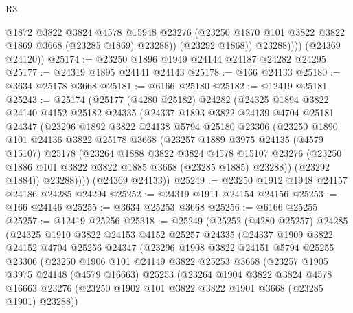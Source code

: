 \begin{lexlean}{R3}
\begin{coremodule}
                  @1872
                  @3822
                  @3824
                  @4578
                  @15948
                  @23276
                  (@23250 @1870 @101 @3822 @3822 @1869 @3668 (@23285 @1869) @23288))
                (@23292 @1868))
              @23288))))
      (@24369 @24120))
@25174 := @23250 @1896 @1949 @24144 @24187 @24282 @24295
@25177 := @24319 @1895 @24141 @24143
@25178 := @166 @24133
@25180 := @3634 @25178 @3668
@25181 := @6166 @25180
@25182 := @12419 @25181
@25243 := @25174
    (@25177
      (@4280 @25182)
      @24282
      (@24325
        @1894
        @3822
        @24140
        @4152
        @25182
        @24335
        (@24337
          @1893
          @3822
          @24139
          @4704
          @25181
          @24347
          (@23296
            @1892
            @3822
            @24138
            @5794
            @25180
            @23306
            (@23250
              @1890
              @101
              @24136
              @3822
              @25178
              @3668
              (@23257
                @1889
                @3975
                @24135
                (@4579 @15107)
                @25178
                (@23264
                  @1888
                  @3822
                  @3824
                  @4578
                  @15107
                  @23276
                  (@23250 @1886 @101 @3822 @3822 @1885 @3668 (@23285 @1885) @23288))
                (@23292 @1884))
              @23288))))
      (@24369 @24133))
@25249 := @23250 @1912 @1948 @24157 @24186 @24285 @24294
@25252 := @24319 @1911 @24154 @24156
@25253 := @166 @24146
@25255 := @3634 @25253 @3668
@25256 := @6166 @25255
@25257 := @12419 @25256
@25318 := @25249
    (@25252
      (@4280 @25257)
      @24285
      (@24325
        @1910
        @3822
        @24153
        @4152
        @25257
        @24335
        (@24337
          @1909
          @3822
          @24152
          @4704
          @25256
          @24347
          (@23296
            @1908
            @3822
            @24151
            @5794
            @25255
            @23306
            (@23250
              @1906
              @101
              @24149
              @3822
              @25253
              @3668
              (@23257
                @1905
                @3975
                @24148
                (@4579 @16663)
                @25253
                (@23264
                  @1904
                  @3822
                  @3824
                  @4578
                  @16663
                  @23276
                  (@23250 @1902 @101 @3822 @3822 @1901 @3668 (@23285 @1901) @23288))

\end{coremodule}
\end{lexlean}
